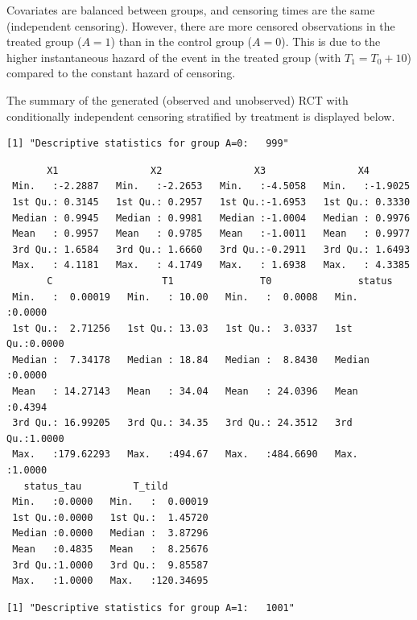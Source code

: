 \documentclass[
  11pt,
  a4paper,
]{article}
\theoremstyle{plain}
\theoremstyle{plain}
\theoremstyle{plain}
\theoremstyle{definition}
\theoremstyle{remark}
\begin{document}
Covariates are balanced between groups, and censoring times are the same
(independent censoring). However, there are more censored observations
in the treated group (\(A=1\)) than in the control group (\(A=0\)). This
is due to the higher instantaneous hazard of the event in the treated
group (with \(T_1=T_0+10\)) compared to the constant hazard of
censoring.

The summary of the generated (observed and unobserved) RCT with
conditionally independent censoring stratified by treatment is displayed
below.

\begin{verbatim}
[1] "Descriptive statistics for group A=0:   999"
\end{verbatim}

\begin{verbatim}
       X1                X2                X3                X4         
 Min.   :-2.2887   Min.   :-2.2653   Min.   :-4.5058   Min.   :-1.9025  
 1st Qu.: 0.3145   1st Qu.: 0.2957   1st Qu.:-1.6953   1st Qu.: 0.3330  
 Median : 0.9945   Median : 0.9981   Median :-1.0004   Median : 0.9976  
 Mean   : 0.9957   Mean   : 0.9785   Mean   :-1.0011   Mean   : 0.9977  
 3rd Qu.: 1.6584   3rd Qu.: 1.6660   3rd Qu.:-0.2911   3rd Qu.: 1.6493  
 Max.   : 4.1181   Max.   : 4.1749   Max.   : 1.6938   Max.   : 4.3385  
       C                   T1               T0               status      
 Min.   :  0.00019   Min.   : 10.00   Min.   :  0.0008   Min.   :0.0000  
 1st Qu.:  2.71256   1st Qu.: 13.03   1st Qu.:  3.0337   1st Qu.:0.0000  
 Median :  7.34178   Median : 18.84   Median :  8.8430   Median :0.0000  
 Mean   : 14.27143   Mean   : 34.04   Mean   : 24.0396   Mean   :0.4394  
 3rd Qu.: 16.99205   3rd Qu.: 34.35   3rd Qu.: 24.3512   3rd Qu.:1.0000  
 Max.   :179.62293   Max.   :494.67   Max.   :484.6690   Max.   :1.0000  
   status_tau         T_tild         
 Min.   :0.0000   Min.   :  0.00019  
 1st Qu.:0.0000   1st Qu.:  1.45720  
 Median :0.0000   Median :  3.87296  
 Mean   :0.4835   Mean   :  8.25676  
 3rd Qu.:1.0000   3rd Qu.:  9.85587  
 Max.   :1.0000   Max.   :120.34695  
\end{verbatim}

\begin{verbatim}
[1] "Descriptive statistics for group A=1:   1001"
\end{verbatim}
\end{document}
